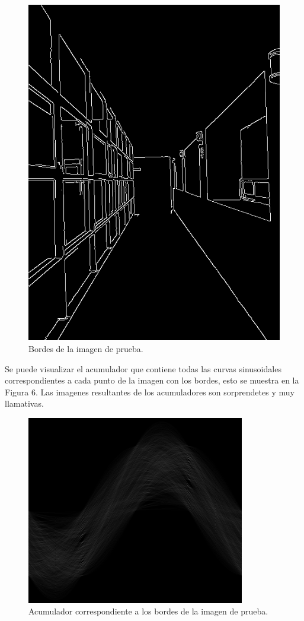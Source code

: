 \documentclass[conference]{IEEEtran}
\begin{document}
\begin{figure}[h]
	\setlength{\unitlength}{0.105in}
	\centering
	\includegraphics[scale=0.35]{./images/dem.png}
	\caption{ Bordes de la imagen de prueba. }
\end{figure}

Se puede visualizar el acumulador que contiene todas las curvas sinusoidales correspondientes a cada punto de la imagen con los bordes, esto se muestra en la Figura 6. Las imagenes resultantes de los acumuladores son sorprendetes y muy llamativas.

\begin{figure}[h]
	\setlength{\unitlength}{0.105in}
	\centering
	\includegraphics[scale=0.60]{./images/collector.png}
	\caption{ Acumulador correspondiente a los bordes de la imagen de prueba. }
\end{figure}
\end{document}
